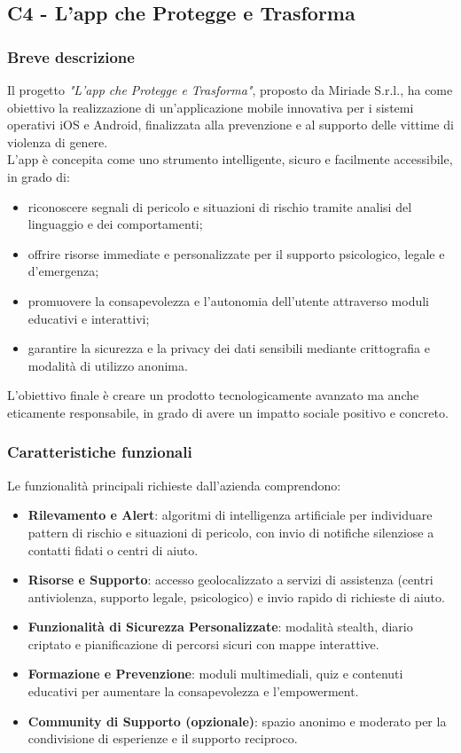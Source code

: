 \documentclass[a4paper,11pt]{article}
\begin{document}
\subsection{C4 - L'app che Protegge e Trasforma}
\subsubsection{Breve descrizione}
Il progetto \textit{"L'app che Protegge e Trasforma"}, proposto da Miriade S.r.l., ha come obiettivo la realizzazione di un'applicazione mobile innovativa per i sistemi operativi iOS e Android, finalizzata alla prevenzione e al supporto delle vittime di violenza di genere.\\

L'app è concepita come uno strumento intelligente, sicuro e facilmente accessibile, in grado di:
\begin{itemize}
  \item riconoscere segnali di pericolo e situazioni di rischio tramite analisi del linguaggio e dei comportamenti;
  \item offrire risorse immediate e personalizzate per il supporto psicologico, legale e d'emergenza;
  \item promuovere la consapevolezza e l'autonomia dell'utente attraverso moduli educativi e interattivi;
  \item garantire la sicurezza e la privacy dei dati sensibili mediante crittografia e modalità di utilizzo anonima.
\end{itemize}
L'obiettivo finale è creare un prodotto tecnologicamente avanzato ma anche eticamente responsabile, in grado di avere un impatto sociale positivo e concreto.

\subsubsection{Caratteristiche funzionali}
Le funzionalità principali richieste dall'azienda comprendono:
\begin{itemize}
  \item \textbf{Rilevamento e Alert}: algoritmi di intelligenza artificiale per individuare pattern di rischio e situazioni di pericolo, con invio di notifiche silenziose a contatti fidati o centri di aiuto.
  \item \textbf{Risorse e Supporto}: accesso geolocalizzato a servizi di assistenza (centri antiviolenza, supporto legale, psicologico) e invio rapido di richieste di aiuto.
  \item \textbf{Funzionalità di Sicurezza Personalizzate}: modalità stealth, diario criptato e pianificazione di percorsi sicuri con mappe interattive.
  \item \textbf{Formazione e Prevenzione}: moduli multimediali, quiz e contenuti educativi per aumentare la consapevolezza e l'empowerment.
  \item \textbf{Community di Supporto (opzionale)}: spazio anonimo e moderato per la condivisione di esperienze e il supporto reciproco.
\end{itemize}
\end{document}
